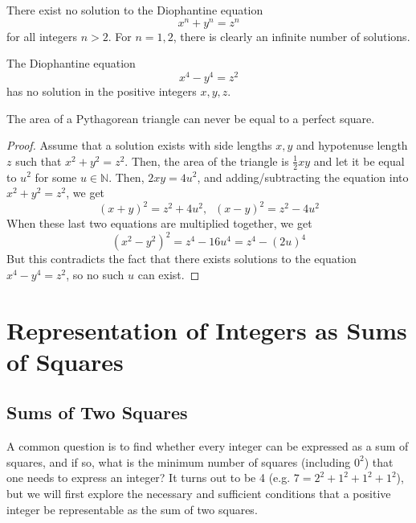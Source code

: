 \documentclass{article}
\newcounter{question}[section]
\newcounter{theorem}[section]
\begin{document}
\begin{theorem}
  \label{thm:fermats-last-theorem}
There exist no solution to the Diophantine equation 
\begin{equation}
  x^n + y^n = z^n
\end{equation}
for all integers $n>2$. For $n=1, 2$, there is clearly an infinite number of solutions. 
\end{theorem}

\begin{theorem}[Fermat]
  \label{thm:fermat}
The Diophantine equation
\begin{equation}
  x^4 - y^4 = z^2
\end{equation}
has no solution in the positive integers $x, y, z$. 
\end{theorem}

\begin{theorem}
  \label{thm:area-of-a-pythagorean-triangle-is-never-a-square}
The area of a Pythagorean triangle can never be equal to a perfect square. 
\end{theorem}
\begin{proof}
Assume that a solution exists with side lengths $x, y$ and hypotenuse length $z$ such that $x^2 + y^2 = z^2$. Then, the area of the triangle is $\frac{1}{2} xy$ and let it be equal to $u^2$ for some $u \in \mathbb{N}$. Then, $2xy = 4u^2$, and adding/subtracting the equation into $x^2 + y^2 = z^2$, we get
\begin{equation}
  (x+y)^2 = z^2 + 4u^2, \;\; (x-y)^2 = z^2 - 4u^2
\end{equation}
When these last two equations are multiplied together, we get
\begin{equation}
  (x^2-y^2)^2 = z^4 - 16u^4 = z^4 - (2u)^4
\end{equation}
But this contradicts the fact that there exists solutions to the equation $x^4 - y^4 = z^2$, so no such $u$ can exist. 
\end{proof}

\section{Representation of Integers as Sums of Squares}
\subsection{Sums of Two Squares}
A common question is to find whether every integer can be expressed as a sum of squares, and if so, what is the minimum number of squares (including $0^2$) that one needs to express an integer? It turns out to be 4 (e.g. $7 = 2^2 + 1^2 + 1^2 + 1^2$), but we will first explore the necessary and sufficient conditions that a positive integer be representable as the sum of two squares. 
\end{document}
